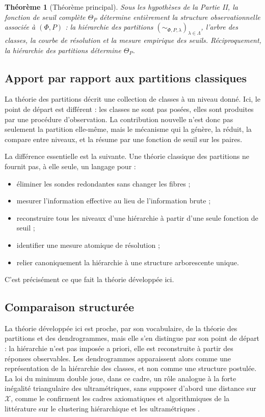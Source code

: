 \documentclass[11pt,a4paper]{article}
\newtheorem{theorem}{Théorème}
\begin{document}
\begin{theorem}[Théorème principal]
Sous les hypothèses de la Partie II, la fonction de seuil complète \(\Theta_P\) détermine entièrement la structure observationnelle associée à \((\Phi,P)\) : la hiérarchie des partitions \((\sim_{\Phi,P,\lambda})_{\lambda\in\Lambda}\), l'arbre des classes, la courbe de résolution et la mesure empirique des seuils. Réciproquement, la hiérarchie des partitions détermine \(\Theta_P\).
\end{theorem}

\subsection{Apport par rapport aux partitions classiques}

La théorie des partitions décrit une collection de classes à un niveau donné. Ici, le point de départ est différent : les classes ne sont pas posées, elles sont produites par une procédure d'observation. La contribution nouvelle n'est donc pas seulement la partition elle-même, mais le mécanisme qui la génère, la réduit, la compare entre niveaux, et la résume par une fonction de seuil sur les paires.

La différence essentielle est la suivante. Une théorie classique des partitions ne fournit pas, à elle seule, un langage pour :
\begin{itemize}[leftmargin=1.4em]
\item éliminer les sondes redondantes sans changer les fibres ;
\item mesurer l'information effective au lieu de l'information brute ;
\item reconstruire tous les niveaux d'une hiérarchie à partir d'une seule fonction de seuil ;
\item identifier une mesure atomique de résolution ;
\item relier canoniquement la hiérarchie à une structure arborescente unique.
\end{itemize}
C'est précisément ce que fait la théorie développée ici.

\subsection{Comparaison structurée}

La théorie développée ici est proche, par son vocabulaire, de la théorie des partitions et des dendrogrammes, mais elle s'en distingue par son point de départ : la hiérarchie n'est pas imposée a priori, elle est reconstruite à partir des réponses observables. Les dendrogrammes apparaissent alors comme une représentation de la hiérarchie des classes, et non comme une structure postulée. La loi du minimum double joue, dans ce cadre, un rôle analogue à la forte inégalité triangulaire des ultramétriques, sans supposer d'abord une distance sur \(\mathcal X\), comme le confirment les cadres axiomatiques et algorithmiques de la littérature sur le clustering hiérarchique et les ultramétriques \cite{carlsson2010,murtagh2017,murtagh2004a,murtagh2004b,rohlf1973,kopp1978}.
\end{document}
